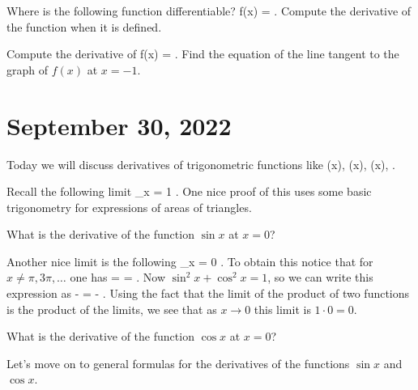 \documentclass[11pt]{amsart}
\begin{document}
\begin{eg}
Where is the following function differentiable?
\beqn
f(x) =  .
\eeqn
Compute the derivative of the function when it is defined.
\end{eg}

\vspace{8cm}

\begin{eg}
Compute the derivative of 
\beqn
f(x) =  .
\eeqn
Find the equation of the line tangent to the graph of $f(x)$ at $x = -1$. 
\end{eg}

\newpage

\section*{September 30, 2022}

Today we will discuss derivatives of trigonometric functions like
\beqn
\sin(x), \quad \cos(x), \quad \tan(x), \quad {} .
\eeqn

Recall the following limit
\beqn
\lim_{x }  = 1 .
\eeqn
One nice proof of this uses some basic trigonometry for expressions of areas of triangles. 

\begin{eg}
What is the derivative of the function $\sin x$ at $x=0$? 
\end{eg}

\vspace{3cm} 

Another nice limit is the following 
\beqn
\lim_{x }  = 0 .
\eeqn
To obtain this notice that for $x \ne \pi,3 \pi, \ldots$ one has
\beqn
{} =  \cdot {} =  .
\eeqn
Now $\sin^2 x + \cos^2 x = 1$, so we can write this expression as 
\beqn
-  = -  \cdot {} .
\eeqn
Using the fact that the limit of the product of two functions is the product of the limits, we see that as $x \to 0$ this limit is $1 \cdot 0 = 0$. 

\begin{eg}
What is the derivative of the function $\cos x$ at $x = 0$? 
\end{eg}
\vspace{3cm}

Let's move on to general formulas for the derivatives of the functions $\sin x$ and $\cos x$. 
\end{document}
